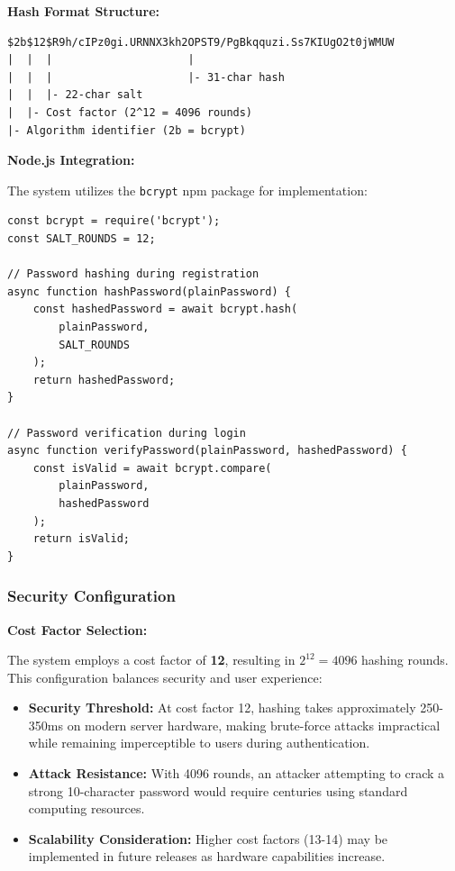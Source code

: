 \documentclass[12pt,a4paper]{article}
\begin{document}
\begin{tcolorbox}[colback=primaryblue!5, colframe=primaryblue, boxrule=1pt, arc=3pt, left=10pt, right=10pt, top=8pt, bottom=8pt]
\vspace{0.5em}

\textbf{Hash Format Structure:}

\begin{verbatim}
$2b$12$R9h/cIPz0gi.URNNX3kh2OPST9/PgBkqquzi.Ss7KIUgO2t0jWMUW
|  |  |                     |
|  |  |                     |- 31-char hash
|  |  |- 22-char salt
|  |- Cost factor (2^12 = 4096 rounds)
|- Algorithm identifier (2b = bcrypt)
\end{verbatim}

\vspace{0.5em}

\textbf{Node.js Integration:}

The system utilizes the \texttt{bcrypt} npm package for implementation:

\begin{verbatim}
const bcrypt = require('bcrypt');
const SALT_ROUNDS = 12;

// Password hashing during registration
async function hashPassword(plainPassword) {
    const hashedPassword = await bcrypt.hash(
        plainPassword, 
        SALT_ROUNDS
    );
    return hashedPassword;
}

// Password verification during login
async function verifyPassword(plainPassword, hashedPassword) {
    const isValid = await bcrypt.compare(
        plainPassword, 
        hashedPassword
    );
    return isValid;
}
\end{verbatim}

\subsubsection{Security Configuration}

\textbf{Cost Factor Selection:}

The system employs a cost factor of \textbf{12}, resulting in $2^{12} = 4096$ hashing rounds. This configuration balances security and user experience:

\begin{itemize}[leftmargin=2em, itemsep=6pt]
    \item \textbf{Security Threshold:} At cost factor 12, hashing takes approximately 250-350ms on modern server hardware, making brute-force attacks impractical while remaining imperceptible to users during authentication.
    \item \textbf{Attack Resistance:} With 4096 rounds, an attacker attempting to crack a strong 10-character password would require centuries using standard computing resources.
    \item \textbf{Scalability Consideration:} Higher cost factors (13-14) may be implemented in future releases as hardware capabilities increase.
\end{itemize}


\end{tcolorbox}
\end{document}
